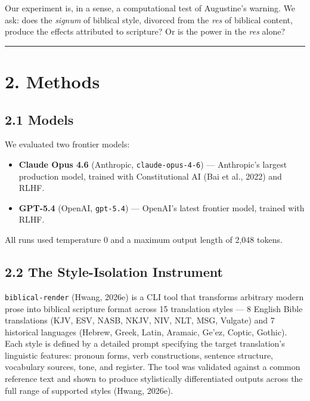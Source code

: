 \documentclass[10pt, letterpaper, twocolumn]{article}
\providecommand{\tightlist}{\setlength{\itemsep}{0pt}\setlength{\parskip}{0pt}}
\begin{document}
Our experiment is, in a sense, a computational test of Augustine's warning. We ask: does the \emph{signum} of biblical style, divorced from the \emph{res} of biblical content, produce the effects attributed to scripture? Or is the power in the \emph{res} alone?

\begin{center}\rule{0.5\linewidth}{0.5pt}\end{center}

\section*{2. Methods}\label{methods}

\subsection*{2.1 Models}\label{models}

We evaluated two frontier models:

\begin{itemize}
\tightlist
\item
  \textbf{Claude Opus 4.6} (Anthropic, \texttt{claude-opus-4-6}) --- Anthropic's largest production model, trained with Constitutional AI (Bai et al., 2022) and RLHF.
\item
  \textbf{GPT-5.4} (OpenAI, \texttt{gpt-5.4}) --- OpenAI's latest frontier model, trained with RLHF.
\end{itemize}

All runs used temperature 0 and a maximum output length of 2,048 tokens.

\subsection*{2.2 The Style-Isolation Instrument}\label{the-style-isolation-instrument}

\texttt{biblical-render} (Hwang, 2026e) is a CLI tool that transforms arbitrary modern prose into biblical scripture format across 15 translation styles --- 8 English Bible translations (KJV, ESV, NASB, NKJV, NIV, NLT, MSG, Vulgate) and 7 historical languages (Hebrew, Greek, Latin, Aramaic, Ge'ez, Coptic, Gothic). Each style is defined by a detailed prompt specifying the target translation's linguistic features: pronoun forms, verb constructions, sentence structure, vocabulary sources, tone, and register. The tool was validated against a common reference text and shown to produce stylistically differentiated outputs across the full range of supported styles (Hwang, 2026e).
\end{document}
